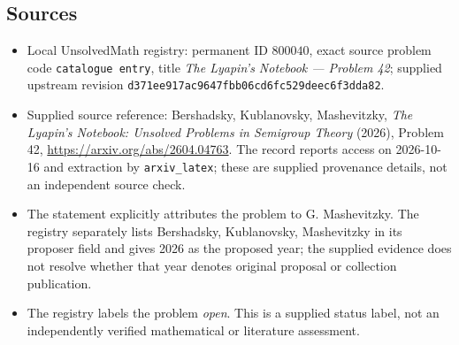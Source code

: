 \documentclass[11pt]{article}
\begin{document}
\subsection{Sources}
\begin{itemize}
\item Local UnsolvedMath registry: permanent ID \(800040\), exact source problem code \texttt{catalogue entry}, title \emph{The Lyapin's Notebook --- Problem 42}; supplied upstream revision \texttt{d371ee917ac9647fbb06cd6fc529deec6f3dda82}.
\item Supplied source reference: Bershadsky, Kublanovsky, Mashevitzky, \emph{The Lyapin's Notebook: Unsolved Problems in Semigroup Theory} (2026), Problem 42, \url{https://arxiv.org/abs/2604.04763}. The record reports access on 2026-10-16 and extraction by \texttt{arxiv\_latex}; these are supplied provenance details, not an independent source check.
\item The statement explicitly attributes the problem to G. Mashevitzky. The registry separately lists Bershadsky, Kublanovsky, Mashevitzky in its proposer field and gives 2026 as the proposed year; the supplied evidence does not resolve whether that year denotes original proposal or collection publication.
\item The registry labels the problem \emph{open}. This is a supplied status label, not an independently verified mathematical or literature assessment.
\end{itemize}
\end{document}
